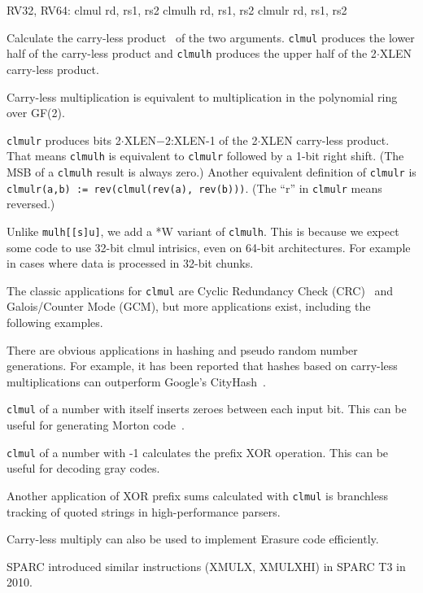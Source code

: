 \begin{rvb}
  RV32, RV64:
    clmul  rd, rs1, rs2
    clmulh rd, rs1, rs2
    clmulr rd, rs1, rs2
\end{rvb}

Calculate the carry-less product~\cite{CarryLessProduct} of the two arguments. \texttt{clmul}
produces the lower half of the carry-less product and \texttt{clmulh} produces the upper half
of the 2$\cdot$XLEN carry-less product.

Carry-less multiplication is equivalent to multiplication in the polynomial ring over GF(2).

\texttt{clmulr} produces bits 2$\cdot$XLEN$-2$:XLEN-1 of the 2$\cdot$XLEN carry-less product.
That means \texttt{clmulh} is equivalent to \texttt{clmulr} followed by a 1-bit right shift.
(The MSB of a \texttt{clmulh} result is always zero.) Another equivalent definition of
\texttt{clmulr} is \texttt{clmulr(a,b) := rev(clmul(rev(a), rev(b)))}. (The ``r''
in \texttt{clmulr} means reversed.)

Unlike {\tt mulh[[s]u]}, we add a *W variant of {\tt clmulh}. This is because we expect
some code to use 32-bit clmul intrisics, even on 64-bit architectures. For example in cases
where data is processed in 32-bit chunks.



The classic applications for \texttt{clmul} are Cyclic Redundancy Check (CRC)~\cite{FastCRC,Wolf18A}
and Galois/Counter Mode (GCM), but more applications exist, including the following examples.

There are obvious applications in hashing and pseudo random number generations. For
example, it has been reported that hashes based on carry-less multiplications can
outperform Google's CityHash~\cite{CLHASH}.

\texttt{clmul} of a number with itself inserts zeroes between each input bit. This can
be useful for generating Morton code~\cite{MortonCode}.

\texttt{clmul} of a number with -1 calculates the prefix XOR operation. This can
be useful for decoding gray codes.

Another application of XOR prefix sums calculated with \texttt{clmul} is
branchless tracking of quoted strings in high-performance parsers.~\cite{ParseJSON}

Carry-less multiply can also be used to implement Erasure code efficiently.~\cite{ClmulErasureCode}

SPARC introduced similar instructions (XMULX, XMULXHI) in SPARC T3 in 2010.~\cite{sparct3}

